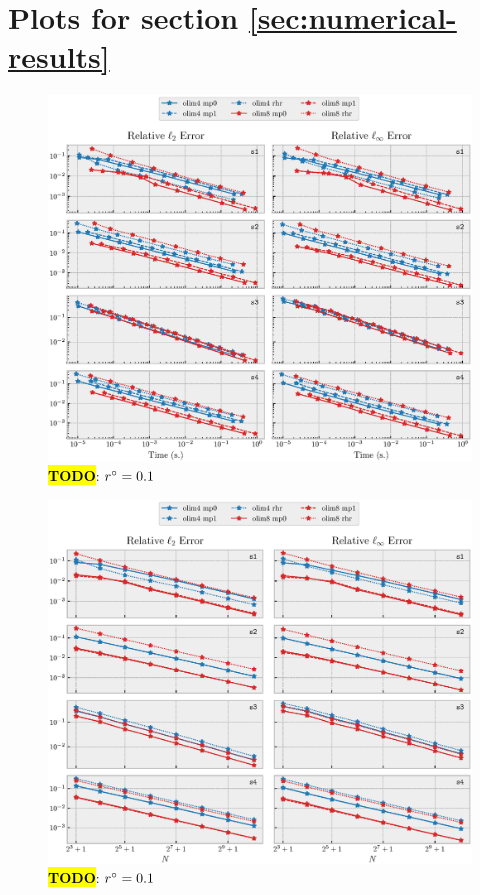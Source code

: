 \documentclass[sisc-eikonal.tex]{subfiles}
\begin{document}
\section{Plots for section \ref{sec:numerical-results}}

\begin{figure}[H]
  \centering
  \includegraphics[width=\linewidth]{time_vs_error_2d.eps}
  \caption{\hl{\textbf{TODO}}: $r^\circ = 0.1$}
\end{figure}

\begin{figure}[H]
  \centering
  \includegraphics[width=\linewidth]{size_vs_error_2d.eps}
  \caption{\hl{\textbf{TODO}}: $r^\circ = 0.1$}
\end{figure}
\end{document}
